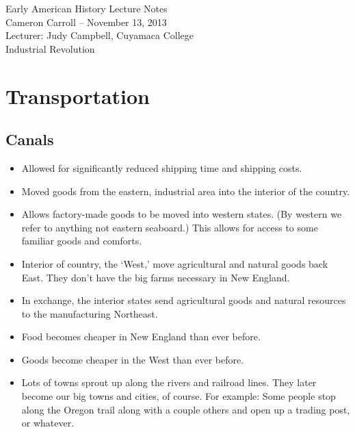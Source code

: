 \documentclass{article}
\begin{document}
\begin{center}
  {\small{} Early American History Lecture Notes} \\[0.6cm]
  {\small{} Cameron Carroll -- November 13, 2013} \\[0.6cm]
  {\small{} Lecturer: Judy Campbell, Cuyamaca College}\\[1cm]
  {\small{} Industrial Revolution}\\[1cm]
\end{center}

\tableofcontents
\newpage

\section{Transportation}
  \subsection{Canals}
    \begin{itemize}
      \item Allowed for significantly reduced shipping time and shipping costs.
      \item Moved goods from the eastern, industrial area into the interior of the country.
      \item Allows factory-made goods to be moved into western states. (By western we refer to anything not eastern seaboard.) This allows for access to some familiar goods and comforts.
      \item Interior of country, the `West,' move agricultural and natural goods back East. They don't have the big farms necessary in New England.
      \item In exchange, the interior states send agricultural goods and natural resources to the manufacturing Northeast.
      \item Food becomes cheaper in New England than ever before.
      \item Goods become cheaper in the West than ever before.
      \item Lots of towns sprout up along the rivers and railroad lines. They later become our big towns and cities, of course. For example: Some people stop along the Oregon trail along with a couple others and open up a trading post, or whatever.
    \end{itemize}
\end{document}

